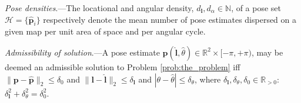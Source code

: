 \begin{definition}
  \label{def:definition_6} \textit{Pose densities}.---The locational and
  angular density, $d_{\bm{l}}, d_{\alpha} \in \mathbb{N}$, of a pose set
  $\mathcal{H} = \{\hat{\bm{p}}_i\}$ respectively denote the mean number of
  pose estimates dispersed on a given map per unit area of space and
  per angular cycle.
\end{definition}

\begin{definition}
  \label{def:definition_7} \textit{Admissibility of solution}.---A pose estimate
  $\hat{\bm{p}}(\hat{\bm{l}},\hat{\theta}) \in \mathbb{R}^2 \times [-\pi,+\pi)$,
  may be deemed an admissible solution to Problem \ref{prob:the_problem} iff
  $\|\bm{p}-\hat{\bm{p}}\|_2 \leq \delta_0$ and
  $\|\bm{l}-\hat{\bm{l}}\|_2 \leq \delta_{\bm{l}}$ and
  $|\theta-\hat{\theta}| \leq \delta_\theta$, where
  $\delta_{\bm{l}}, \delta_\theta, \delta_0 \in \mathbb{R}_{> 0}$:
  $\delta_{\bm{l}}^2 + \delta_{\theta}^2 = \delta_0^2$.
\end{definition}
